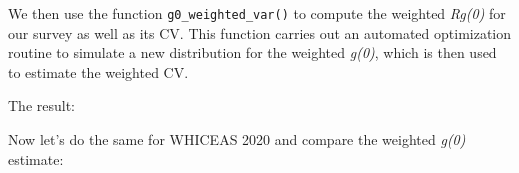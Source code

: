 \documentclass[
]{book}
\newenvironment{Shaded}{\begin{snugshade}}{\end{snugshade}}
\newcommand{\AttributeTok}[1]{\textcolor[rgb]{0.77,0.63,0.00}{#1}}
\newcommand{\CommentTok}[1]{\textcolor[rgb]{0.56,0.35,0.01}{\textit{#1}}}
\newcommand{\DecValTok}[1]{\textcolor[rgb]{0.00,0.00,0.81}{#1}}
\newcommand{\ErrorTok}[1]{\textcolor[rgb]{0.64,0.00,0.00}{\textbf{#1}}}
\newcommand{\FloatTok}[1]{\textcolor[rgb]{0.00,0.00,0.81}{#1}}
\newcommand{\FunctionTok}[1]{\textcolor[rgb]{0.00,0.00,0.00}{#1}}
\newcommand{\NormalTok}[1]{#1}
\newcommand{\OtherTok}[1]{\textcolor[rgb]{0.56,0.35,0.01}{#1}}
\newcommand{\SpecialCharTok}[1]{\textcolor[rgb]{0.00,0.00,0.00}{#1}}
\begin{document}
\begin{Shaded}
\end{Shaded}

We then use the function \texttt{g0\_weighted\_var()} to compute the weighted \emph{Rg(0)} for our survey as well as its CV. This function carries out an automated optimization routine to simulate a new distribution for the weighted \emph{g(0)}, which is then used to estimate the weighted CV.

\begin{Shaded}
\end{Shaded}

The result:

\begin{Shaded}
\end{Shaded}

Now let's do the same for WHICEAS 2020 and compare the weighted \emph{g(0)} estimate:
\end{document}

